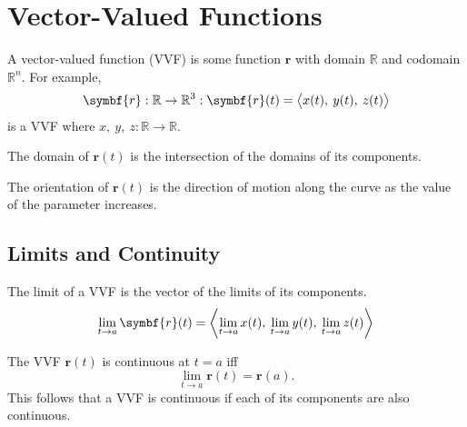 \documentclass{article}
\begin{document}
\section{Vector-Valued Functions}
\begin{definition}
    A vector-valued function (VVF) is some function \(\symbf{r}\)
    with domain \(\mathbb{R}\) and codomain \(\mathbb{R}^n\).
    For example,
    \begin{equation*}
        \symbf{r}:\mathbb{R}\to\mathbb{R}^3
        :\symbf{r}(t)=\avec[\big]{x(t),\: y(t),\: z(t)}
    \end{equation*}
    is a VVF where \(x,\:y,\:z: \mathbb{R}\to\mathbb{R}\).
\end{definition}
\begin{theorem}
    The domain of \(\symbf{r}(t)\) is the intersection of the domains
    of its components.
\end{theorem}
\begin{definition}[Orientation]
    The orientation of \(\symbf{r}(t)\) is the direction of motion along the
    curve as the value of the parameter increases.
\end{definition}
\subsection{Limits and Continuity}
\begin{theorem}
    The limit of a VVF is the vector of the limits of its components.
    \begin{equation*}
        \lim_{t\to a} \symbf{r}(t)
        = \avec[\bigg]{\lim_{t\to a} x(t),\: \lim_{t\to a} y(t),\: \lim_{t\to a} z(t)}
    \end{equation*}
\end{theorem}
\begin{theorem}
    The VVF \(\symbf{r}(t)\) is continuous at \(t=a\) iff
    \begin{equation*}
        \lim_{t\to a} \symbf{r}(t) = \symbf{r}(a).
    \end{equation*}
    This follows that a VVF is continuous if each of its components are also continuous.
\end{theorem}
\end{document}

